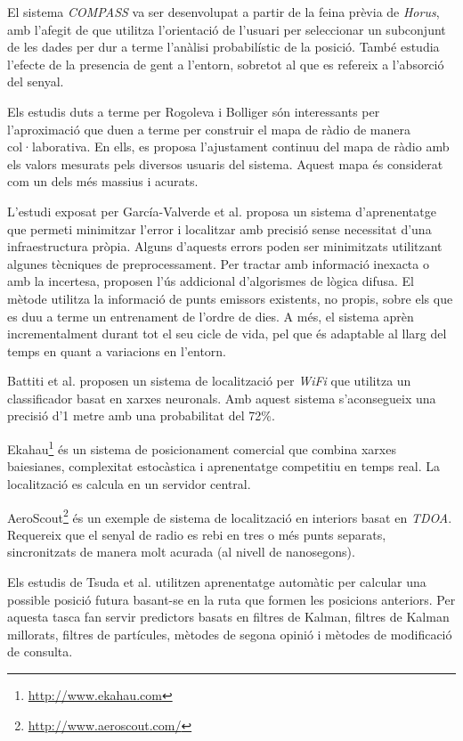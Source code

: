 El sistema \textit{COMPASS} \cite{king} va ser desenvolupat a partir de la feina prèvia de \textit{Horus}, amb l’afegit de que utilitza l'orientació de l’usuari per seleccionar un subconjunt de les dades per dur a terme l’anàlisi probabilístic de la posició. També estudia l’efecte de la presencia de gent a l’entorn, sobretot al que es refereix a l’absorció del senyal.

Els estudis duts a terme per Rogoleva \cite{rogoleva} i Bolliger \cite{bolliger} són interessants per l’aproximació que duen a terme per construir el mapa de ràdio de manera col·laborativa. En ells, es proposa l’ajustament continuu del mapa de ràdio amb els valors mesurats pels diversos usuaris del sistema. Aquest mapa és considerat com un dels més massius i acurats.

L'estudi exposat per García-Valverde et al. \cite{garcia} proposa un sistema d'aprenentatge que permeti minimitzar l'error i localitzar amb precisió sense necessitat d'una infraestructura pròpia. Alguns d'aquests errors poden ser minimitzats utilitzant algunes tècniques de preprocessament.  Per tractar amb informació inexacta o amb la incertesa, proposen l'ús addicional d'algorismes de lògica difusa. El mètode utilitza la informació de punts emissors existents, no propis, sobre els que es duu a terme un entrenament de l'ordre de dies. A més, el sistema aprèn incrementalment durant tot el seu cicle de vida, pel que és adaptable al llarg del temps en quant a variacions en l’entorn.

Battiti et al. \cite{battiti} proposen un sistema de localització per \textit{WiFi} que utilitza un classificador basat en xarxes neuronals. Amb aquest sistema s'aconsegueix una precisió d'1 metre amb una probabilitat del 72\%.

Ekahau\footnote{\url{http://www.ekahau.com}} és un sistema de posicionament comercial que combina xarxes baiesianes, complexitat estocàstica i aprenentatge competitiu en temps real. La localització es calcula en un servidor central.

AeroScout\footnote{\url{http://www.aeroscout.com/}} és un exemple de sistema de localització en interiors basat en \textit{TDOA}. Requereix que el senyal de radio es rebi en tres o més punts separats, sincronitzats de manera molt acurada (al nivell de nanosegons).

Els estudis de Tsuda et al. \cite{tsuda} utilitzen aprenentatge automàtic per calcular una possible posició futura basant-se en la ruta que formen les posicions anteriors. Per aquesta tasca fan servir predictors basats en filtres de Kalman, filtres de Kalman millorats, filtres de partícules, mètodes de segona opinió i mètodes de modificació de consulta.


